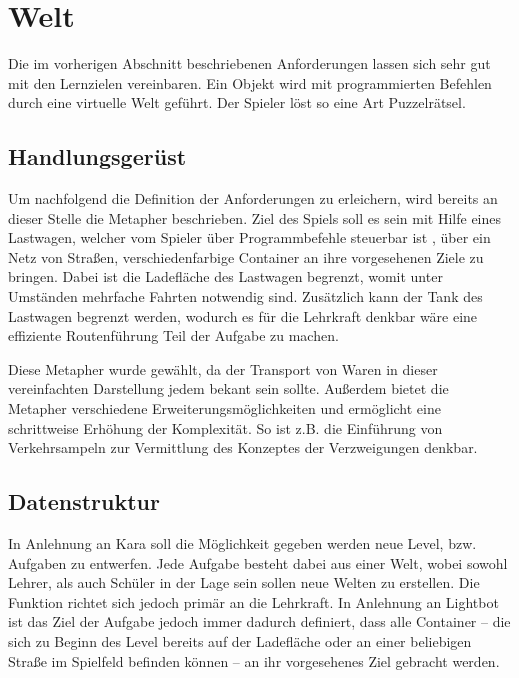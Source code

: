 \section{Welt}
\label{sec:requirements:world}

Die im vorherigen Abschnitt beschriebenen Anforderungen lassen sich sehr gut mit den Lernzielen vereinbaren. Ein Objekt wird mit programmierten Befehlen durch eine virtuelle Welt geführt. Der Spieler löst so eine Art Puzzelrätsel.

\subsection{Handlungsgerüst}
\label{sec:requirements:world:metaphor}

Um nachfolgend die Definition der Anforderungen zu erleichern, wird bereits an dieser Stelle die Metapher beschrieben. Ziel des Spiels soll es sein mit Hilfe eines Lastwagen, welcher vom Spieler über Programmbefehle steuerbar ist , über ein Netz von Straßen, verschiedenfarbige Container an ihre vorgesehenen Ziele zu bringen. Dabei ist die Ladefläche des Lastwagen begrenzt, womit unter Umständen mehrfache Fahrten notwendig sind. Zusätzlich kann der Tank des Lastwagen begrenzt werden, wodurch es für die Lehrkraft denkbar wäre eine effiziente Routenführung Teil der Aufgabe zu machen.

Diese Metapher wurde gewählt, da der Transport von Waren in dieser vereinfachten Darstellung jedem bekant sein sollte. Außerdem bietet die Metapher verschiedene Erweiterungsmöglichkeiten und ermöglicht eine schrittweise Erhöhung der Komplexität. So ist z.B. die Einführung von Verkehrsampeln zur Vermittlung des Konzeptes der Verzweigungen denkbar.

\subsection{Datenstruktur}
\label{sec:requirements:world:structure}

In Anlehnung an Kara soll die Möglichkeit gegeben werden neue Level, bzw. Aufgaben zu entwerfen. Jede Aufgabe besteht dabei aus einer Welt, wobei sowohl Lehrer, als auch Schüler in der Lage sein sollen neue Welten zu erstellen. Die Funktion richtet sich jedoch primär an die Lehrkraft. In Anlehnung an Lightbot ist das Ziel der Aufgabe jedoch immer dadurch definiert, dass alle Container -- die sich zu Beginn des Level bereits auf der Ladefläche oder an einer beliebigen Straße im Spielfeld befinden können -- an ihr vorgesehenes Ziel gebracht werden.

